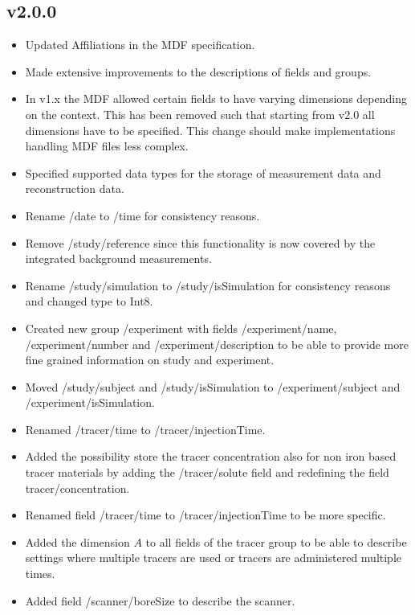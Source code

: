\documentclass[landscape,a4paper]{article} %
\newcommand{\inlvar}[1]{{\ttfamily#1}}
\begin{document}
\begin{multicols}{2}
\subsection{v2.0.0}

\begin{itemize}
	\item Updated Affiliations in the MDF specification.
	\item Made extensive improvements to the descriptions of fields and groups.
	\item In v1.x the MDF allowed certain fields to have varying dimensions depending on the context. This has been removed such that starting from v2.0 all dimensions have to be specified. This change  should make implementations handling MDF files less complex. 
	\item Specified supported data types for the storage of measurement data and reconstruction data.
	\item Rename \inlvar{/date} to \inlvar{/time} for consistency reasons.
	\item Remove \inlvar{/study/reference} since this functionality is now covered by the integrated background measurements.
	\item Rename \inlvar{/study/simulation} to \inlvar{/study/isSimulation} for consistency reasons and changed type to \inlvar{Int8}.
	\item Created new group \inlvar{/experiment} with fields \inlvar{/experiment/name}, \inlvar{/experiment/number} and \inlvar{/experiment/description} to be able to provide more fine grained information on study and experiment.
	\item Moved \inlvar{/study/subject} and \inlvar{/study/isSimulation} to \inlvar{/experiment/subject} and \inlvar{/experiment/isSimulation}.
	\item Renamed \inlvar{/tracer/time} to \inlvar{/tracer/injectionTime}.
	\item Added the possibility store the tracer concentration also for non iron based tracer materials by adding the \inlvar{/tracer/solute} field and redefining the field \inlvar{tracer/concentration}.
	\item Renamed field \inlvar{/tracer/time} to \inlvar{/tracer/injectionTime} to be more specific.
	\item Added the dimension $A$ to all fields of the \inlvar{tracer} group to be able to describe settings where multiple tracers are used or tracers are administered multiple times.
	\item Added field \inlvar{/scanner/boreSize} to describe the scanner.

\end{itemize}
\end{multicols}
\end{document}
